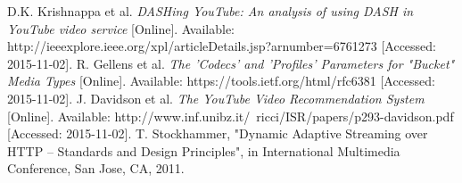 \begin{thebibliography}{5}
        D.K. Krishnappa et al.
        \textit{DASHing YouTube: An analysis of using DASH in YouTube video service}
        [Online].
        Available:
        http://ieeexplore.ieee.org/xpl/articleDetails.jsp?arnumber=6761273
        [Accessed: 2015-11-02].
        R. Gellens et al.
        \textit{The 'Codecs' and 'Profiles' Parameters for "Bucket" Media Types}
        [Online].
        Available:
        https://tools.ietf.org/html/rfc6381
        [Accessed: 2015-11-02].
        J. Davidson et al.
        \textit{The YouTube Video Recommendation System}
        [Online].
        Available:
        http://www.inf.unibz.it/~ricci/ISR/papers/p293-davidson.pdf
        [Accessed: 2015-11-02].
        T. Stockhammer,
        "Dynamic Adaptive Streaming over HTTP – Standards and Design Principles",
        in International Multimedia Conference,
        San Jose, CA,
        2011.
\end{thebibliography}
